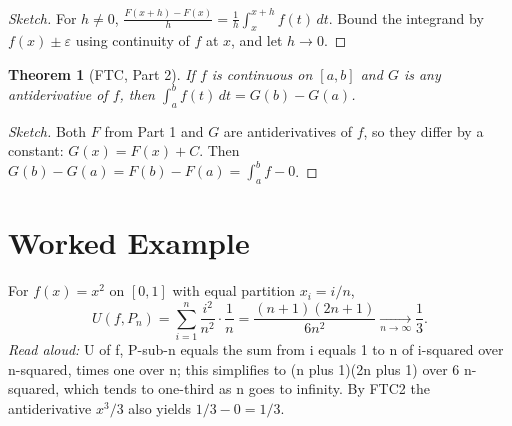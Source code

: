 \documentclass[11pt]{article}
\newtheorem{theorem}{Theorem}
\begin{document}
\begin{proof}[Sketch]
For $h \neq 0$,
$\frac{F(x+h) - F(x)}{h} = \frac{1}{h} \int_x^{x+h} f(t)\,dt$.
Bound the integrand by $f(x) \pm \varepsilon$ using continuity of $f$ at $x$, and let
$h \to 0$.
\end{proof}

\begin{theorem}[FTC, Part 2]
If $f$ is continuous on $[a,b]$ and $G$ is any antiderivative of $f$, then
$\int_a^b f(t)\,dt = G(b) - G(a)$.
\end{theorem}

\begin{proof}[Sketch]
Both $F$ from Part 1 and $G$ are antiderivatives of $f$, so they differ by a constant:
$G(x) = F(x) + C$. Then $G(b) - G(a) = F(b) - F(a) = \int_a^b f - 0$.
\end{proof}

\section{Worked Example}
For $f(x) = x^2$ on $[0,1]$ with equal partition $x_i = i/n$,
\[ U(f, P_n) = \sum_{i=1}^{n} \frac{i^2}{n^2}\cdot\frac{1}{n}
              = \frac{(n+1)(2n+1)}{6n^2} \xrightarrow[n\to\infty]{} \frac{1}{3}. \]
\emph{Read aloud:} U of f, P-sub-n equals the sum from i equals 1 to n of i-squared over n-squared, times one over n; this simplifies to (n plus 1)(2n plus 1) over 6 n-squared, which tends to one-third as n goes to infinity.
By FTC2 the antiderivative $x^3/3$ also yields $1/3 - 0 = 1/3$.
\end{document}
